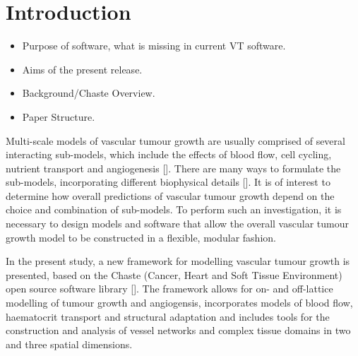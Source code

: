 \documentclass[superscriptaddress, a4paper]{article}
\begin{document}
\section{Introduction}
\label{sec:introduction}

\begin{itemize}
 \item Purpose of software, what is missing in current VT software.
 \item Aims of the present release. 
 \item Background/Chaste Overview. 
 \item Paper Structure. 
\end{itemize}

Multi-scale models of vascular tumour growth are usually comprised of several interacting sub-models, which include the effects of blood flow, cell cycling, nutrient transport and angiogenesis []. There are many ways to formulate the sub-models, incorporating different biophysical details []. It is of interest to determine how overall predictions of vascular tumour growth depend on the choice and combination of sub-models. To perform such an investigation, it is necessary to design models and software that allow the overall vascular tumour growth model to be constructed in a flexible, modular fashion. 

In the present study, a new  framework for modelling vascular tumour growth is presented, based on the Chaste (Cancer, Heart and Soft Tissue Environment) open source software library []. The framework allows for on- and off-lattice modelling of tumour growth and angiogensis, incorporates models of blood flow, haematocrit transport and structural adaptation and includes tools for the construction and analysis of vessel networks and complex tissue domains in two and three spatial dimensions. 
\end{document}
